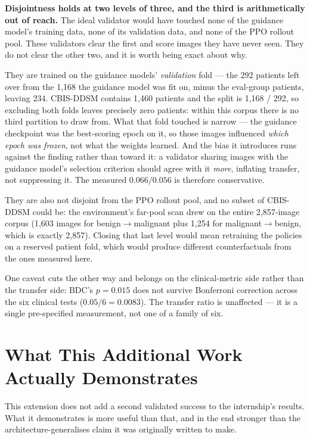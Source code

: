 \textbf{Disjointness holds at two levels of three, and the third is
arithmetically out of reach.} The ideal validator would have touched none of
the guidance model's training data, none of its validation data, and none of
the PPO rollout pool. These validators clear the first and score images they
have never seen. They do not clear the other two, and it is worth being exact
about why.

They are trained on the guidance models' \emph{validation} fold --- the 292
patients left over from the 1{,}168 the guidance model was fit on, minus the
eval-group patients, leaving 234. CBIS-DDSM contains 1{,}460 patients and the
split is 1{,}168 / 292, so excluding both folds leaves precisely zero
patients: within this corpus there is no third partition to draw from. What
that fold touched is narrow --- the guidance checkpoint was the best-scoring
epoch on it, so those images influenced \emph{which epoch was frozen}, not
what the weights learned. And the bias it introduces runs against the finding
rather than toward it: a validator sharing images with the guidance model's
selection criterion should agree with it \emph{more}, inflating transfer, not
suppressing it. The measured $0.066/0.056$ is therefore conservative.

They are also not disjoint from the PPO rollout pool, and no subset of
CBIS-DDSM could be: the environment's far-pool scan drew on the entire
2{,}857-image corpus (1{,}603 images for benign$\to$malignant plus 1{,}254
for malignant$\to$benign, which is exactly 2{,}857). Closing that last level
would mean retraining the policies on a reserved patient fold, which would
produce different counterfactuals from the ones measured here.

One caveat cuts the other way and belongs on the clinical-metric side rather
than the transfer side: BDC's $p=0.015$ does not survive Bonferroni
correction across the six clinical tests ($0.05/6 = 0.0083$). The transfer
ratio is unaffected --- it is a single pre-specified measurement, not one of
a family of six.

\section{What This Additional Work Actually Demonstrates}

This extension does not add a second validated success to the internship's
results. What it demonstrates is more useful than that, and in the end
stronger than the architecture-generalises claim it was originally written to
make.

